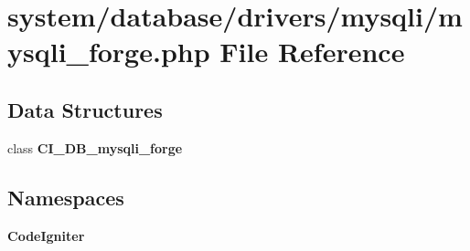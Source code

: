 \section{system/database/drivers/mysqli/mysqli\-\_\-forge.php File Reference}
\label{mysqli__forge_8php}
\subsection*{Data Structures}
\begin{DoxyCompactItemize}
\item 
class {\bf C\-I\-\_\-\-D\-B\-\_\-mysqli\-\_\-forge}
\end{DoxyCompactItemize}
\subsection*{Namespaces}
\begin{DoxyCompactItemize}
\item 
{\bf Code\-Igniter}
\end{DoxyCompactItemize}
